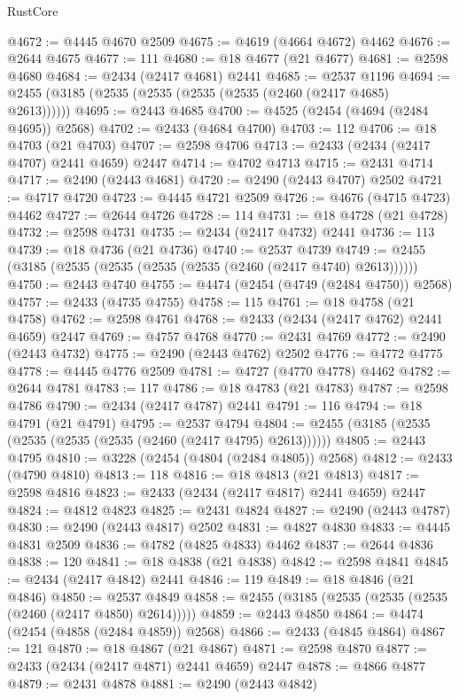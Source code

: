\begin{lexlean}{RustCore}
\begin{coremodule}
@4672 := @4445 @4670 @2509
@4675 := @4619 (@4664 @4672) @4462
@4676 := @2644 @4675
@4677 := 111
@4680 := @18 @4677 (@21 @4677)
@4681 := @2598 @4680
@4684 := @2434 (@2417 @4681) @2441
@4685 := @2537 @1196
@4694 := @2455 (@3185 (@2535 (@2535 (@2535 (@2535 (@2460 (@2417 @4685) @2613))))))
@4695 := @2443 @4685
@4700 := @4525 (@2454 (@4694 (@2484 @4695)) @2568)
@4702 := @2433 (@4684 @4700)
@4703 := 112
@4706 := @18 @4703 (@21 @4703)
@4707 := @2598 @4706
@4713 := @2433 (@2434 (@2417 @4707) @2441 @4659) @2447
@4714 := @4702 @4713
@4715 := @2431 @4714
@4717 := @2490 (@2443 @4681)
@4720 := @2490 (@2443 @4707) @2502
@4721 := @4717 @4720
@4723 := @4445 @4721 @2509
@4726 := @4676 (@4715 @4723) @4462
@4727 := @2644 @4726
@4728 := 114
@4731 := @18 @4728 (@21 @4728)
@4732 := @2598 @4731
@4735 := @2434 (@2417 @4732) @2441
@4736 := 113
@4739 := @18 @4736 (@21 @4736)
@4740 := @2537 @4739
@4749 := @2455 (@3185 (@2535 (@2535 (@2535 (@2535 (@2460 (@2417 @4740) @2613))))))
@4750 := @2443 @4740
@4755 := @4474 (@2454 (@4749 (@2484 @4750)) @2568)
@4757 := @2433 (@4735 @4755)
@4758 := 115
@4761 := @18 @4758 (@21 @4758)
@4762 := @2598 @4761
@4768 := @2433 (@2434 (@2417 @4762) @2441 @4659) @2447
@4769 := @4757 @4768
@4770 := @2431 @4769
@4772 := @2490 (@2443 @4732)
@4775 := @2490 (@2443 @4762) @2502
@4776 := @4772 @4775
@4778 := @4445 @4776 @2509
@4781 := @4727 (@4770 @4778) @4462
@4782 := @2644 @4781
@4783 := 117
@4786 := @18 @4783 (@21 @4783)
@4787 := @2598 @4786
@4790 := @2434 (@2417 @4787) @2441
@4791 := 116
@4794 := @18 @4791 (@21 @4791)
@4795 := @2537 @4794
@4804 := @2455 (@3185 (@2535 (@2535 (@2535 (@2535 (@2460 (@2417 @4795) @2613))))))
@4805 := @2443 @4795
@4810 := @3228 (@2454 (@4804 (@2484 @4805)) @2568)
@4812 := @2433 (@4790 @4810)
@4813 := 118
@4816 := @18 @4813 (@21 @4813)
@4817 := @2598 @4816
@4823 := @2433 (@2434 (@2417 @4817) @2441 @4659) @2447
@4824 := @4812 @4823
@4825 := @2431 @4824
@4827 := @2490 (@2443 @4787)
@4830 := @2490 (@2443 @4817) @2502
@4831 := @4827 @4830
@4833 := @4445 @4831 @2509
@4836 := @4782 (@4825 @4833) @4462
@4837 := @2644 @4836
@4838 := 120
@4841 := @18 @4838 (@21 @4838)
@4842 := @2598 @4841
@4845 := @2434 (@2417 @4842) @2441
@4846 := 119
@4849 := @18 @4846 (@21 @4846)
@4850 := @2537 @4849
@4858 := @2455 (@3185 (@2535 (@2535 (@2535 (@2460 (@2417 @4850) @2614)))))
@4859 := @2443 @4850
@4864 := @4474 (@2454 (@4858 (@2484 @4859)) @2568)
@4866 := @2433 (@4845 @4864)
@4867 := 121
@4870 := @18 @4867 (@21 @4867)
@4871 := @2598 @4870
@4877 := @2433 (@2434 (@2417 @4871) @2441 @4659) @2447
@4878 := @4866 @4877
@4879 := @2431 @4878
@4881 := @2490 (@2443 @4842)

\end{coremodule}
\end{lexlean}
